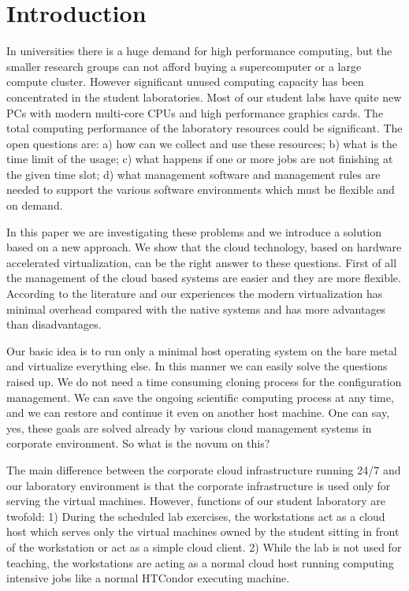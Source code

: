 \documentclass{llncs}
\begin{document}
\section{Introduction}
In universities there is a huge demand for high performance computing, but the smaller research groups can not afford buying a supercomputer or a large compute cluster. However significant unused computing capacity has been concentrated in the student laboratories. Most of our student labs have quite new PCs with modern multi-core CPUs and high performance graphics cards. The total computing performance of the laboratory resources could be significant. The open questions are: a) how can we collect and use these resources; b) what is the time limit of the usage; c) what happens if one or more jobs are not finishing at the given time slot; d) what management software and management rules are needed to support the various software environments which must be flexible and on demand. 

In this paper we are investigating these problems and we introduce a solution based on a new approach. We show that the cloud technology, based on hardware accelerated virtualization, can be the right answer to these questions. First of all the management of the cloud based systems are easier and they are more flexible. According to the literature\cite{younge2011analysis} and our experiences the modern virtualization has minimal overhead compared with the native systems and has more advantages than disadvantages.

Our basic idea is to run only a minimal host operating system on the bare metal and virtualize everything else. In this manner we can easily solve the questions raised up. We do not need a time consuming cloning process for the configuration management. We can save the ongoing scientific computing process at any time, and we can restore and continue it  even on another host machine. One can say, yes, these goals are solved already by various cloud management systems in corporate environment. So what is the novum on this? 

The main difference between the  corporate cloud infrastructure running 24/7 and our laboratory environment is that the corporate infrastructure is used only for serving the virtual machines. However, functions of our student laboratory are twofold:  1) During the scheduled lab exercises, the workstations act as a cloud host which serves only the virtual machines owned by the student sitting in front of the workstation or act as a simple cloud client. 2) While the lab is not used for teaching, the workstations are acting as a normal cloud host running computing intensive jobs like a normal HTCondor executing machine. 
\end{document}
